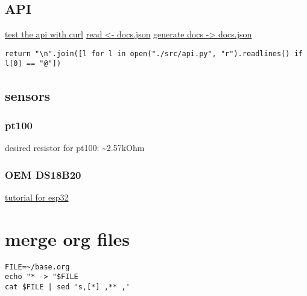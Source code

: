 \documentclass[11pt]{article}
\begin{document}
\subsection{API}
\label{sec:org9007b89}
\hyperref[sec:org4775819]{test the api with curl}
\href{cat \~/py/esp/docs.json|sed 's,\\":,\\n\\t\\t,'|sed  's,\{,,'|sed 's,\},,'|sed 's,\\",,'|sed 's.,..' | sed 's,\\\\n,\\n,' \&}{read            <- docs.json}
\hyperref[sec:orgfa380a2]{generate docs   -> docs.json}
\begin{verbatim}
return "\n".join([l for l in open("./src/api.py", "r").readlines() if l[0] == "@"])
\end{verbatim}

\subsection{sensors}
\label{sec:org54d714c}
\subsubsection{pt100}
\label{sec:org38dfa17}
desired resistor for pt100: \textasciitilde{}2.57kOhm
\subsubsection{OEM DS18B20}
\label{sec:org5afc2f3}
\href{https://randomnerdtutorials.com/micropython-ds18b20-esp32-esp8266/}{tutorial for esp32}
\section{merge org files}
\label{sec:org844e627}
\begin{verbatim}
FILE=~/base.org
echo "* -> "$FILE
cat $FILE | sed 's,[*] ,** ,'
\end{verbatim}
\end{document}
